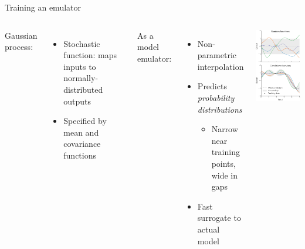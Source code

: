 \documentclass{beamer}
\begin{document}
\begin{frame}{Training an emulator}
  \vspace{1em}
  \begin{columns}[c]
    Gaussian process:
    \begin{itemize}
      \item Stochastic function: maps inputs to normally-distributed outputs
      \item Specified by mean and covariance functions
    \end{itemize}
    \bigskip
    As a model emulator:
    \begin{itemize}
      \item Non-parametric interpolation
      \item Predicts \emph{probability distributions}
        \begin{itemize}
          \item Narrow near training points, \\ wide in gaps
        \end{itemize}
      \item Fast surrogate to actual model
    \end{itemize}
    \includegraphics{gp}
  \end{columns}
\end{frame}
\end{document}

